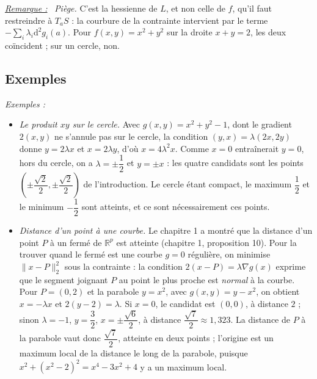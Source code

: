 \documentclass[a4paper,twoside]{report}
\newenvironment{remarque}%
 {\par\needspace{6\baselineskip}\vspace{1mm}\begin{list}{}{\leftmargin=1cm \rightmargin=0.5cm}\item[]%
  \textit{\underline{Remarque :}}~}%
 {\end{list}\vspace{1mm}}
\newenvironment{exemples}%
 {\par\needspace{6\baselineskip}\vspace{1mm}\begin{list}{}{\leftmargin=1cm \rightmargin=0.5cm}\item[]%
  \textit{Exemples :}%
  \begin{itemize}[label=$\bullet$,leftmargin=0.45cm,topsep=3pt,itemsep=4pt]}%
 {\end{itemize}\end{list}\vspace{1mm}}
\newcommand{\R}{\mathbb{R}}
\newcommand{\dd}{\mathrm{d}}                      %
\newcommand{\norme}[1]{\lVert #1 \rVert}         %
\newcommand{\grad}{\nabla}                        %
\begin{document}
\begin{remarque}
\emph{Piège.} C'est la hessienne de $L$, et non celle de $f$, qu'il faut restreindre à $T_{a}S$ : la courbure de la contrainte intervient par le terme $-\sum_{i}\lambda_{i}\dd^{2} g_{i}(a)$. Pour $f(x, y) = x^{2} + y^{2}$ sur la droite $x + y = 2$, les deux coïncident ; sur un cercle, non.
\end{remarque}

\subsection{Exemples}

\begin{exemples}
  \item \emph{Le produit $xy$ sur le cercle.} Avec $g(x, y) = x^{2} + y^{2} - 1$, dont le gradient $2(x, y)$ ne s'annule pas sur le cercle, la condition $(y, x) = \lambda(2x, 2y)$ donne $y = 2\lambda x$ et $x = 2\lambda y$, d'où $x = 4\lambda^{2}x$. Comme $x = 0$ entraînerait $y = 0$, hors du cercle, on a $\lambda = \pm\dfrac{1}{2}$ et $y = \pm x$ : les quatre candidats sont les points $\left(\pm\dfrac{\sqrt{2}}{2}, \pm\dfrac{\sqrt{2}}{2}\right)$ de l'introduction. Le cercle étant compact, le maximum $\dfrac{1}{2}$ et le minimum $-\dfrac{1}{2}$ sont atteints, et ce sont nécessairement ces points.
  \item \emph{Distance d'un point à une courbe.} Le chapitre 1 a montré que la distance d'un point $P$ à un fermé de $\R^{p}$ est atteinte (chapitre 1, proposition 10). Pour la trouver quand le fermé est une courbe $g = 0$ régulière, on minimise $\norme{x - P}_{2}^{2}$ sous la contrainte : la condition $2(x - P) = \lambda\grad g(x)$ exprime que le segment joignant $P$ au point le plus proche est \emph{normal} à la courbe. Pour $P = (0, 2)$ et la parabole $y = x^{2}$, avec $g(x, y) = y - x^{2}$, on obtient $x = -\lambda x$ et $2(y - 2) = \lambda$. Si $x = 0$, le candidat est $(0, 0)$, à distance $2$ ; sinon $\lambda = -1$, $y = \dfrac{3}{2}$, $x = \pm\dfrac{\sqrt{6}}{2}$, à distance $\dfrac{\sqrt{7}}{2} \approx 1{,}323$. La distance de $P$ à la parabole vaut donc $\dfrac{\sqrt{7}}{2}$, atteinte en deux points ; l'origine est un maximum local de la distance le long de la parabole, puisque $x^{2} + (x^{2} - 2)^{2} = x^{4} - 3x^{2} + 4$ y a un maximum local.
\end{exemples}
\end{document}
